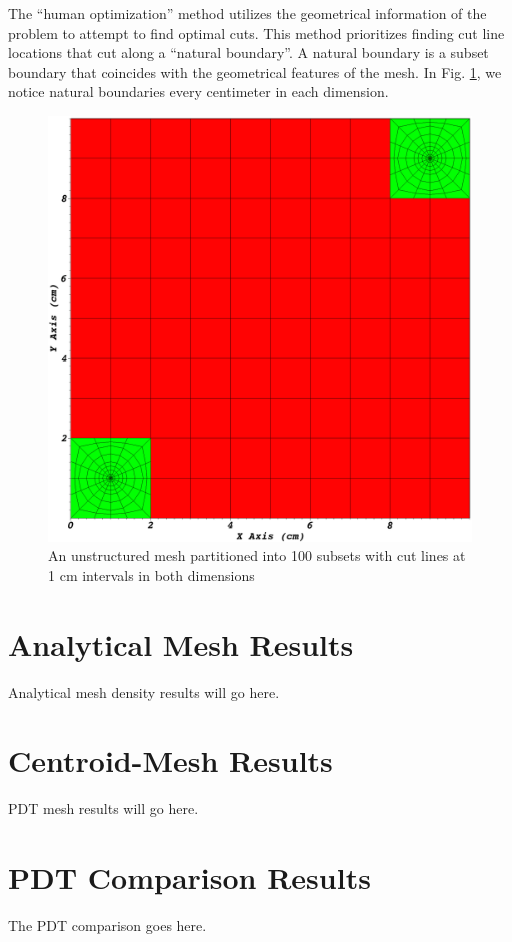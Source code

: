   The ``human optimization'' method utilizes the geometrical information of the problem to attempt to find optimal cuts. This method prioritizes finding cut line locations that cut along a ``natural boundary''. A natural boundary is a subset boundary that coincides with the geometrical features of the mesh. In Fig. \ref{partitioning_example}, we notice natural boundaries every centimeter in each dimension. 
 \begin{figure}[H]
\centering
\includegraphics[scale=0.2]{../figures/spiderweb_10x10_sparse.png}
\caption{An unstructured mesh partitioned into 100 subsets with cut lines at 1 cm intervals in both dimensions}
\label{partitioning_example}
\end{figure}

\section{Analytical Mesh Results}
Analytical mesh density results will go here.

\section{Centroid-Mesh Results}

PDT mesh results will go here.

\section{PDT Comparison Results}

The PDT comparison goes here.
